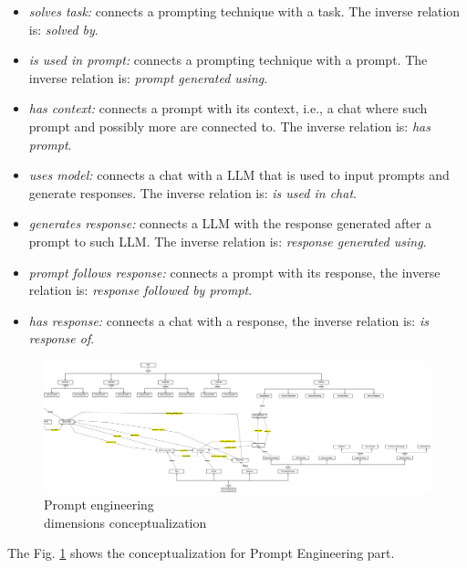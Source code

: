 \begin{itemize}
    \item \textit{solves task:} connects a prompting technique with a task. The inverse relation is: \textit{solved by}.

    \item \textit{is used in prompt:} connects a prompting technique with a prompt. The inverse relation is: \textit{prompt generated using}.

    \item \textit{has context:} connects a prompt with its context, i.e., a chat where such prompt and possibly more are connected to. The inverse relation is: \textit{has prompt}.

    \item \textit{uses model:} connects a chat with a LLM that is used to input prompts and generate responses. The inverse relation is: \textit{is used in chat}.

    \item \textit{generates response:} connects a LLM with the response generated after a prompt to such LLM. The inverse relation is: \textit{response generated using}.

    \item \textit{prompt follows response:} connects a prompt with its response, the inverse relation is: \textit{response followed by prompt}.

    \item \textit{has response:} connects a chat with a response, the inverse relation is: \textit{is response of}.
\end{itemize}

\begin{figure}[H]
    \centering
    \includegraphics[width=0.9\linewidth]{Figures/fig_27.png}
    \caption{Prompt engineering\\ dimensions conceptualization}
    \label{fig:27}
\end{figure}
The Fig. \ref{fig:27} shows the conceptualization for Prompt Engineering part.

